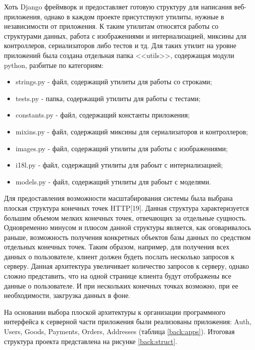 Хоть Django фреймворк и предоставляет готовую структуру для написания веб-приложения, однако в каждом проекте присутствуют утилиты, нужные в независимости от приложения.
К таким утилитам относятся работы со структурами данных, работа с изображениями и интернализацией, миксины для контроллеров, сериализаторов либо тестов и тд.
Для таких утилит на уровне приложений была создана отдельная папка <<utils>>, содержащая модули python, разбитые по категориям:
\begin{itemize}
    \item strings.py - файл, содержащий утилиты для работы со строками;
    \item tests.py - папка, содержащий утилиты для работы с тестами;
    \item constants.py - файл, содержащий константы приложения;
    \item mixins.py - файл, содержащий миксины для сериализаторов и контроллеров;
    \item images.py - файл, содержащий утилиты для работы с изображениями;
    \item i18l.py - файл, содержащий утилиты для рабоыт с интернализацией;
    \item models.py - файл, содержащий утилиты для рабоыт с моделями.
\end{itemize}

Для предоставления возможности масштабирования системы была выбрана плоская структура конечных точек HTTP[19].
Данная структура характеризуется большим объемом мелких конечных точек, отвечающих за отдельные сущность.
Одновременно минусом и плюсом данной структуры является, как оговаривалось раньше, возможность получения конкретных объектов базы данных по средством отдельных конечных точек.
Таким образом, например, для получения всех данных о пользователе, клиент должен будеть послать несколько запросов к серверу.
Данная архитектура увеличивает количество запросов к серверу, однако сложно представить, что на одной странице клиента будут отображены все данные о пользователе.
И при нескольких конечных точках возможно, при ее необходимости, закгрузка данных в фоне.

На основании выбора плоской архитектуры к организации программного интерфейса к серверной части приложения были реализованы приложения: Auth, Users, Goods, Payments, Orders, Addresses (таблица \ref{back:apps}).
Итоговая структура проекта представлена на рисунке \ref{back:struct}.


